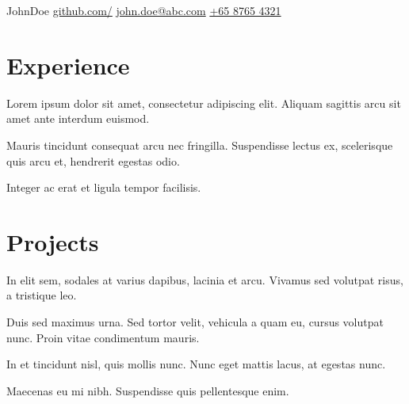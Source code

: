 \documentclass[]{resume}
\begin{document}
%
%

\namesection
{John}{Doe}
{
    \contactline
    {\href{https://www.github.com/}{github.com/}}
    {\href{mailto:john.doe@abc.com}{john.doe@abc.com}}
    {\href{tel:+6587654321}{+65 8765 4321}}
}



\section{Experience}

\begin{tightemize}
    \item Lorem ipsum dolor sit amet, consectetur adipiscing elit. Aliquam sagittis arcu sit amet ante interdum euismod.
    \item Mauris tincidunt consequat arcu nec fringilla. Suspendisse lectus ex, scelerisque quis arcu et, hendrerit egestas odio.
    \item Integer ac erat et ligula tempor facilisis.
\end{tightemize}
\sectionsep



\section{Projects}

\begin{tightemize}
    \item In elit sem, sodales at varius dapibus, lacinia et arcu. Vivamus sed volutpat risus, a tristique leo. 
    \item Duis sed maximus urna. Sed tortor velit, vehicula a quam eu, cursus volutpat nunc. Proin vitae condimentum mauris. 
\end{tightemize}
\sectionsep

\begin{tightemize}
    \item In et tincidunt nisl, quis mollis nunc. Nunc eget mattis lacus, at egestas nunc.
    \item Maecenas eu mi nibh. Suspendisse quis pellentesque enim.
\end{tightemize}
\sectionsep
\end{document}
